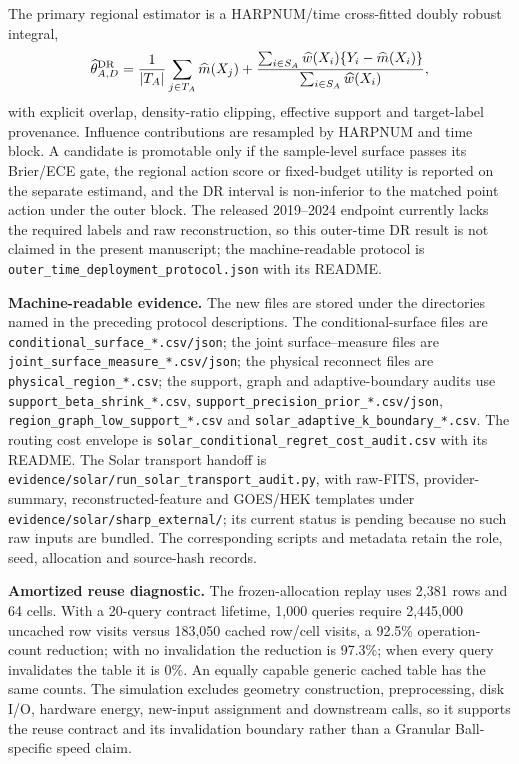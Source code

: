 \documentclass[11pt,a4paper]{article}
\numberwithin{equation}{section}
\theoremstyle{definition}\newtheorem{definition}[theorem]{Definition}
\theoremstyle{remark}\newtheorem{remark}[theorem]{Remark}
\begin{document}
The primary regional estimator is a HARPNUM/time cross-fitted doubly robust integral,
\[
 \widehat\theta_{A,D}^{\rm DR}=
 \frac{1}{|T_A|}\sum_{j\in T_A}\widehat m(X_j)
 +\frac{\sum_{i\in S_A}\widehat w(X_i)\{Y_i-\widehat m(X_i)\}}
 {\sum_{i\in S_A}\widehat w(X_i)},
\]
with explicit overlap, density-ratio clipping, effective support and target-label provenance. Influence contributions are resampled by HARPNUM and time block. A candidate is promotable only if the sample-level surface passes its Brier/ECE gate, the regional action score or fixed-budget utility is reported on the separate estimand, and the DR interval is non-inferior to the matched point action under the outer block. The released 2019--2024 endpoint currently lacks the required labels and raw reconstruction, so this outer-time DR result is not claimed in the present manuscript; the machine-readable protocol is \texttt{outer\_time\_deployment\_protocol.json} with its README.

\textbf{Machine-readable evidence.} The new files are stored under the directories named in the preceding protocol descriptions. The conditional-surface files are \texttt{conditional\_surface\_*.csv/json}; the joint surface--measure files are \texttt{joint\_surface\_measure\_*.csv/json}; the physical reconnect files are \texttt{physical\_region\_*.csv}; the support, graph and adaptive-boundary audits use \texttt{support\_beta\_shrink\_*.csv}, \texttt{support\_precision\_prior\_*.csv/json}, \texttt{region\_graph\_low\_support\_*.csv} and \texttt{solar\_adaptive\_k\_boundary\_*.csv}. The routing cost envelope is \texttt{solar\_conditional\_regret\_cost\_audit.csv} with its README. The Solar transport handoff is \texttt{evidence/solar/run\_solar\_transport\_audit.py}, with raw-FITS, provider-summary, reconstructed-feature and GOES/HEK templates under \texttt{evidence/solar/sharp\_external/}; its current status is pending because no such raw inputs are bundled. The corresponding scripts and metadata retain the role, seed, allocation and source-hash records.

\textbf{Amortized reuse diagnostic.} The frozen-allocation replay uses 2,381 rows and 64 cells. With a 20-query contract lifetime, 1,000 queries require 2,445,000 uncached row visits versus 183,050 cached row/cell visits, a 92.5\% operation-count reduction; with no invalidation the reduction is 97.3\%; when every query invalidates the table it is 0\%. An equally capable generic cached table has the same counts. The simulation excludes geometry construction, preprocessing, disk I/O, hardware energy, new-input assignment and downstream calls, so it supports the reuse contract and its invalidation boundary rather than a Granular Ball-specific speed claim.
\end{document}
